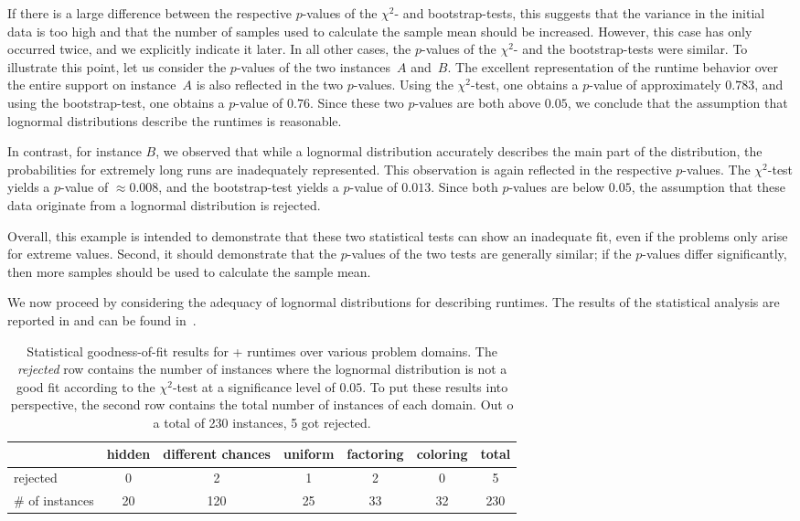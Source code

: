 If there is a large difference between the respective $p$-values of the $\chi^2$- and bootstrap-tests, this suggests that the variance in the initial data is too high and that the number of samples used to calculate the sample mean should be increased. However, this case has only occurred twice, and we explicitly indicate it later. In all other cases, the $p$-values of the $\chi^2$- and the bootstrap-tests were similar.
To illustrate this point, let us consider the $p$-values of the two instances~$A$ and~$B$. The excellent representation of the runtime behavior over the entire support on instance~$A$ is also reflected in the two $p$-values. Using the $\chi^2$-test, one obtains a $p$-value of approximately $0.783$, and using the bootstrap-test, one obtains a $p$-value of $0.76$. Since these two $p$-values are both above $0.05$, we conclude that the assumption that lognormal distributions describe the runtimes is reasonable.

In contrast, for instance $B$, we observed that while a lognormal distribution accurately describes the main part %
of the distribution,
the probabilities for extremely long runs are inadequately represented. This observation is again reflected in the respective $p$-values. The $\chi^2$-test yields a $p$-value of 
$\approx 0.008$, and the bootstrap-test yields a $p$-value of $0.013$. Since both $p$-values are
below 
$0.05$, the assumption that these data originate from a lognormal distribution is rejected.

Overall, this example is intended to demonstrate that these two statistical tests can show an inadequate fit, even if the problems only arise for extreme values. Second, it should demonstrate that the $p$-values of the two tests are generally similar; if the $p$-values differ significantly, then more samples should be used to calculate the sample mean.

We now proceed by considering the adequacy of lognormal distributions for describing \SRWA{} runtimes.  The results of the statistical analysis are reported in  and can be found in~\cite{AllData}.
\begin{table}[htb]
	\begin{tabular}{l| c c c c c || c}
		& hidden & different chances & uniform & factoring & coloring & total\\ \hline
		rejected & 0 & 2 & 1 & 2 & 0 & 5\\
		$\#$ of instances & 20 & 120 & 25 & 33 & 32 & 230
	\end{tabular}
	\caption{Statistical goodness-of-fit results for \Alfa{}+\SRWA{} runtimes over various problem domains. The \emph{rejected} row contains the number of instances where the lognormal distribution is not a good fit according to the $\chi^2$-test at a significance level of $0.05$. To put these results into perspective, the second row contains the total number of instances of each domain. Out o a total of 230 instances, 5 got rejected.}
	\label{tab:stat}
\end{table}

